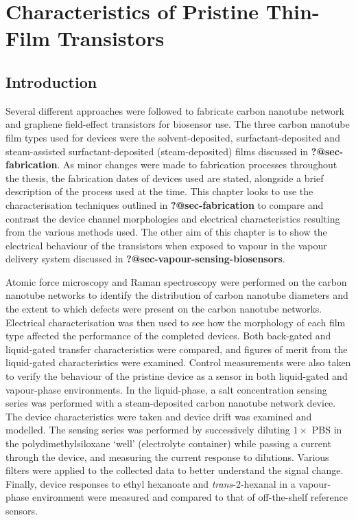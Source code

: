 \documentclass[
  letterpaper,
  DIV=11,
  numbers=noendperiod]{scrartcl}
\author{}
\date{}
\begin{document}
\ifdefined\Shaded\renewenvironment{Shaded}{\begin{tcolorbox}[sharp corners, breakable, frame hidden, boxrule=0pt, enhanced, interior hidden, borderline west={3pt}{0pt}{shadecolor}]}{\end{tcolorbox}}\fi

\hypertarget{sec-pristine-characteristics}{%
\section{Characteristics of Pristine Thin-Film
Transistors}\label{sec-pristine-characteristics}}

\hypertarget{introduction}{%
\subsection{Introduction}\label{introduction}}

Several different approaches were followed to fabricate carbon nanotube
network and graphene field-effect transistors for biosensor use. The
three carbon nanotube film types used for devices were the
solvent-deposited, surfactant-deposited and steam-assisted
surfactant-deposited (steam-deposited) films discussed in
\textbf{?@sec-fabrication}. As minor changes were made to fabrication
processes throughout the thesis, the fabrication dates of devices used
are stated, alongside a brief description of the process used at the
time. This chapter looks to use the characterisation techniques outlined
in \textbf{?@sec-fabrication} to compare and contrast the device channel
morphologies and electrical characteristics resulting from the various
methods used. The other aim of this chapter is to show the electrical
behaviour of the transistors when exposed to vapour in the vapour
delivery system discussed in \textbf{?@sec-vapour-sensing-biosensors}.

Atomic force microscopy and Raman spectroscopy were performed on the
carbon nanotube networks to identify the distribution of carbon nanotube
diameters and the extent to which defects were present on the carbon
nanotube networks. Electrical characterisation was then used to see how
the morphology of each film type affected the performance of the
completed devices. Both back-gated and liquid-gated transfer
characteristics were compared, and figures of merit from the
liquid-gated characteristics were examined. Control measurements were
also taken to verify the behaviour of the pristine device as a sensor in
both liquid-gated and vapour-phase environments. In the liquid-phase, a
salt concentration sensing series was performed with a steam-deposited
carbon nanotube network device. The device characteristics were taken
and device drift was examined and modelled. The sensing series was
performed by successively diluting \(1 \times\) PBS in the
polydimethylsiloxane `well' (electrolyte container) while passing a
current through the device, and measuring the current response to
dilutions. Various filters were applied to the collected data to better
understand the signal change. Finally, device responses to ethyl
hexanoate and \emph{trans}-2-hexanal in a vapour-phase environment were
measured and compared to that of off-the-shelf reference sensors.
\end{document}
